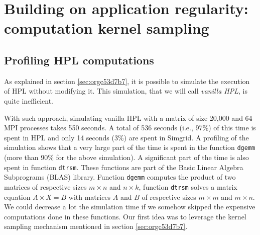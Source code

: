 \documentclass[12pt, a4paper]{memoir}
\begin{document}
\section{Building on application regularity: computation kernel sampling}
\label{sec:org6b54c65}
\subsection{Profiling HPL computations}
\label{sec:org09b225d}
As explained in section \ref{sec:orgc53d7b7}, it is possible to simulate the execution of HPL without modifying it. This
simulation, that we will call \emph{vanilla HPL}, is quite inefficient.

With such approach, simulating vanilla HPL with a matrix of size 20,000 and 64 MPI processes takes 550 seconds. A
total of 536 seconds (i.e., 97\%) of this time is spent in HPL and only 14 seconds (3\%) are spent in Simgrid. A
profiling of the simulation shows that a very large part of the time is spent in the function \texttt{dgemm} (more than 90\%
for the above simulation). A significant part of the time is also spent in function \texttt{dtrsm}. These functions are part
of the Basic Linear Algebra Subprograms (BLAS) library. Function \texttt{dgemm} computes the product of two matrices of
respective sizes \(m \times n\) and \(n \times k\), function \texttt{dtrsm} solves a matrix equation \(A \times X = B\) with matrices \(A\) and \(B\)
of respective sizes \(m \times m\) and \(m \times n\). We could decrease a lot the simulation time if we somehow skipped the
expensive computations done in these functions. Our first idea was to leverage the kernel sampling mechanism
mentioned in section \ref{sec:orgc53d7b7}.
\end{document}
